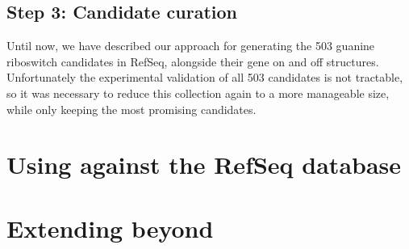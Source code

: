 
\subsection{Step 3: Candidate curation}
\label{subsec:rfinder:curation}

Until now, we have described our approach for generating the 503 guanine riboswitch candidates in RefSeq, alongside their gene on and off structures. Unfortunately the experimental validation of all 503 candidates is not tractable, so it was necessary to reduce this collection again to a more manageable size, while only keeping the most promising candidates.

\section{Using \rfinder against the RefSeq database}
\label{sec:rfinder:refseq}

\section{Extending beyond \grbs}
\label{sec:rfinder:ext}
